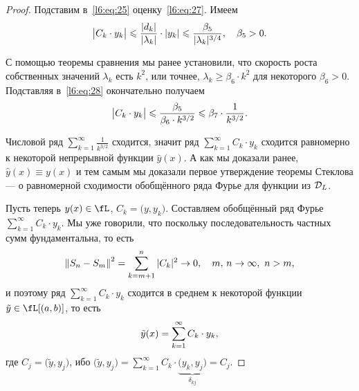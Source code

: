 \begin{proof}
	\noindent Подставим в~\eqref{l6:eq:25} оценку~\eqref{l6:eq:27}. Имеем 
	\begin{equation}
		\label{l6:eq:28}
		\hfill\big|C_k\cdot y_k\big|\leqslant\frac{|d_k|}{|\lambda_k|}\cdot|y_k|\leqslant\frac{\beta_5}{|\lambda_k|^{3/4}},\quad\beta_5>0.\hfill
	\end{equation}
	
	С помощью теоремы сравнения мы ранее установили, что скорость роста собственных значений $\lambda_k$ есть $k^2$, или точнее, $\lambda_k\geqslant\beta_6\cdot k^2$ для некоторого $\beta_6>0$. Подставляя в~\eqref{l6:eq:28} окончательно получаем 
	\begin{equation}
		\hfill\big|C_k\cdot y_k\big|\leqslant\frac{\beta_5}{\beta_6\cdot k^{3/2}}\leqslant\beta_7\cdot\frac{1}{k^{3/2}}.\hfill
	\end{equation}
	
	Числовой ряд $\sum\limits_{k=1}^{\infty}\frac{\textstyle1}{\textstyle k^{3/2}}$ сходится, значит ряд $\sum\limits_{k=1}^{\infty}C_k\cdot y_k$ сходится равномерно к некоторой непрерывной функции $\hat{y}(x)$. А как мы доказали ранее, $\hat{y}(x)\equiv y(x)$ и тем самым мы доказали первое утверждение теоремы Стеклова --- о равномерной сходимости обобщённого ряда Фурье для функции из $\mathcal{D}_L$.
	\vspace{0,2cm}
	
	Пусть теперь $y(x)\in\fL$, $C_k=\big(y,y_k\big)$. Составляем обобщённый ряд Фурье $\sum\limits_{k=1}^{\infty}C_k\cdot y_k$. Мы уже говорили, что поскольку последовательность частных сумм фундаментальна, то есть
	\begin{equation*}
		\hfill{\norm{S_n-S_m}}^2=\sum\limits_{k=m+1}^n|C_k|^2\to0,\quad m,\,n\to\infty,\ n>m,\hfill
	\end{equation*}
	и поэтому ряд $\sum\limits_{k=1}^{\infty}C_k\cdot y_k$ сходится в среднем к некоторой функции $\tilde{y}\in\fL[(a,b)]$, то есть
	\begin{equation}
		\label{l6:eq:30}
		\hfill \tilde{y}(x)=\sum\limits_{k=1}^{\infty}C_k\cdot y_k,\hfill
	\end{equation}
	где $C_j=\big(\tilde{y},y_j\big)$, ибо $\big(\tilde{y},y_j\big)=\sum\limits_{k=1}^{\infty}C_k\cdot\underbrace{\big(y_k,y_j\big)}_{\delta_{kj}}=C_j$.
	

\end{proof}

